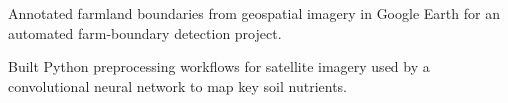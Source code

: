 \documentclass[letterpaper]{deedy-resume} %
\begin{document}
\begin{minipage}[t]{0.66\textwidth}






\begin{tightitemize}
\item Annotated farmland boundaries from geospatial imagery in Google Earth for an automated farm-boundary detection project.
\item Built Python preprocessing workflows for satellite imagery used by a convolutional neural network to map key soil nutrients.
\end{tightitemize}
\sectionspace %


\end{minipage}
\end{document}
